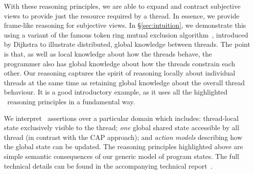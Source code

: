 With these reasoning principles, we are able to expand and contract
subjective views  to provide just the resource required by a thread.
In essence, we provide  frame-like reasoning for  subjective  views. 
In 
\S\ref{sec:intuition}, we 
demonstrate this using 
a variant of the famous token ring mutual exclusion algorithm~\cite{dijkstra74},
introduced by Dijkstra to illustrate distributed, global knowledge between
threads. The point is that, as well as local knowledge
about how the threads behave, the programmer also has global knowledge
about how the threads constrain each other. Our reasoning captures the
spirit of reasoning locally about individual threads at the same time
as retaining global knowledge about the overall thread behaviour. It
is a good  introductory example, as it uses all the highlighted \colosl\ reasoning principles in a fundamental way. 

We interpret \colosl\ assertions
 over a particular domain which includes: thread-local
state exclusively visible to the thread; {\em one} global shared state
accessible by all thread (in contrast with the CAP approach); and {\em
  action models} describing how the global state can be updated.  The
reasoning principles highlighted above are simple semantic
consequences of our generic model of program states.  The full
technical details can
be found 
in the accompanying technical report~\cite{colosl-tr14}.





